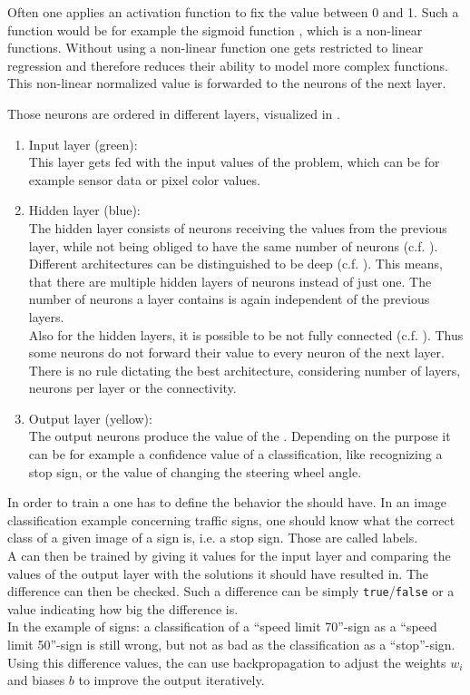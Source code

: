 Often one applies an activation function to fix the value between 0 and 1. Such a function would be for example the sigmoid function \cite{von2016crc}, which is a non-linear functions. Without using a non-linear function one gets restricted to linear regression and therefore reduces their ability to model more complex functions. \cite{glorot2010understanding}
This non-linear normalized value is forwarded to the neurons of the next layer.

Those neurons are ordered in different layers, visualized in .
\begin{enumerate}
	\item Input layer (green):\\ \label{item input layer}
	This layer gets fed with the input values of the problem, which can be for example sensor data or pixel color values.
	\item Hidden layer (blue):\\\label{item hidden layer}
	The hidden layer consists of neurons receiving the values from the previous layer, while not being obliged to have the same number of neurons (c.f. ).
	Different architectures can be distinguished to be deep (c.f. ). This means, that there are multiple hidden layers of neurons instead of just one. The number of neurons a layer contains is again independent of the previous layers.\\
	Also for the hidden layers, it is possible to be not fully connected (c.f. ). Thus some neurons do not forward their value to every neuron of the next layer.\\
	There is no rule dictating the best architecture, considering number of layers, neurons per layer or the connectivity.
	\item Output layer (yellow):\\ \label{item output layer}
	The output neurons produce the value of the \nn. Depending on the \nns purpose it can be for example a confidence value of a classification, like recognizing a stop sign, or the value of changing the steering wheel angle. 
\end{enumerate}

In order to train a \nn one has to define the behavior the \nn should have. In an image classification example concerning traffic signs, one should know what the correct class of a given image of a sign is, i.e. a stop sign. Those are called labels.\\
A \nn can then be trained by giving it values for the input layer and comparing the values of the output layer with the solutions it should have resulted in. The difference can then be checked. Such a difference can be simply \texttt{true}/\texttt{false} or a value indicating how big the difference is.\\
In the example of signs: a classification of a ``speed limit 70''-sign as a ``speed limit 50''-sign is still wrong, but not as bad as the classification as a ``stop''-sign.\\
Using this difference values, the \nn can use backpropagation \cite{kinnebrock1994neuronale} to adjust the weights $w_i$ and biases $b$ to improve the output iteratively.

